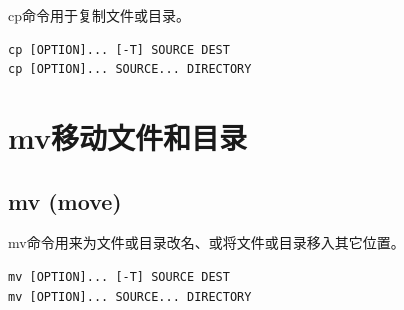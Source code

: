 \documentclass[12pt, openany, oneside]{book}
\begin{document}
cp命令用于复制文件或目录。

\vspace{-0.5cm}
\begin{lstlisting}
cp [OPTION]... [-T] SOURCE DEST
cp [OPTION]... SOURCE... DIRECTORY
\end{lstlisting}

\begin{table}[H]
	\centering
	\caption{cp参数说明}
\end{table}

\newpage

\section{mv移动文件和目录}

\subsection{mv (move)}

mv命令用来为文件或目录改名、或将文件或目录移入其它位置。

\vspace{-0.5cm}
\begin{lstlisting}
mv [OPTION]... [-T] SOURCE DEST
mv [OPTION]... SOURCE... DIRECTORY
\end{lstlisting}
\end{document}
